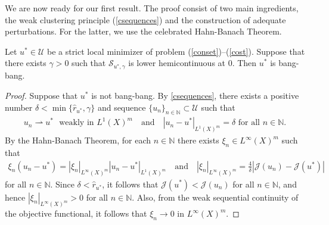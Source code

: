 \documentclass[hidelinks,onefignum,onetabnum]{siamart220329}
\begin{document}
We are now ready for our first result. The proof consist of two main ingredients, the weak clustering principle (\cref{csequences}) and the construction of adequate perturbations. For the latter, we use the celebrated Hahn-Banach Theorem.
\begin{proposition}\label{imbang}
	Let $u^*\in\mathcal U$ be a strict local minimizer of problem (\ref{conset})--(\ref{cost}). Suppose that there exists $\gamma>0$ such that $\mathcal S_{u^*,\gamma}$ is lower hemicontinuous at $0$. Then $u^*$ is bang-bang.
\end{proposition}
\begin{proof}
	Suppose that $u^*$ is not bang-bang. By \cref{csequences}, there exists a positive number $\delta<\min\{\hat r_{u^*},\gamma\}$ and sequence $\{u_{n}\}_{n\in\mathbb N}\subset\mathcal U$ such that 
	\begin{align*}
		u_{n}\rightharpoonup u^*\,\,\,\,\text{weakly in $L^1(X)^m$}\quad\text{and}\quad\text{$|u_n-u^*|_{L^1(X)^m}=\delta$ for all $n\in\mathbb N$}.
	\end{align*}
	By the Hahn-Banach Theorem, for each $n\in\mathbb N$ there exists  $\xi_n\in L^\infty(X)^m$ such that
	\begin{align*}
		\xi_{n}(u_n-u^*)=|\xi_n|_{L^\infty(X)^m}|u_n-u^*|_{L^1(X)^m}\quad\text{and}\quad |\xi_{n}|_{L^\infty(X)^m}=\frac{4}{\delta}|\mathcal J(u_n)-\mathcal J(u^*)|
	\end{align*}
	for all $n\in\mathbb N$. Since $\delta<\hat r_{u^*}$, it follows that  $\mathcal J(u^*)<\mathcal J(u_n)$ for all $n\in\mathbb N$, and hence $|\xi_{n}|_{L^\infty(X)^m}>0$ for all $n\in\mathbb N$. Also, from the weak sequential continuity of the objective functional, it follows that $\xi_{n}\to 0$ in $L^\infty(X)^m$.
	
	
	

\end{proof}
\end{document}
